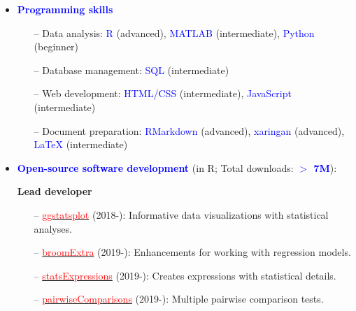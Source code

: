 \documentclass[10pt]{article}
\begin{document}
	\begin{itemize}
	
	\item \textcolor{blue}{\textbf{Programming skills}}\\
     \vspace*{-0.09in}
     
    \begin{itemize}
    
    \itemsep-0.1em		
	\item[--] Data analysis: \textcolor{blue}{R} (advanced), \textcolor{blue}{MATLAB} (intermediate), \textcolor{blue}{Python} (beginner)
	\item[--] Database management: \textcolor{blue}{SQL} (intermediate)
	\item[--] Web development: \textcolor{blue}{HTML/CSS} (intermediate), \textcolor{blue}{JavaScript} (intermediate)
	\item[--] Document preparation: \textcolor{blue}{RMarkdown} (advanced), \textcolor{blue}{xaringan} (advanced), \textcolor{blue}{\LaTeX{}} (intermediate)

	\end{itemize}
	
	\item \textcolor{blue}{\textbf{Open-source software development}} (in R; Total downloads: \textcolor{blue}{\textbf{$>$ 7M}}):
	 
	 \textbf{Lead developer}
	 
	\begin{itemize}
	
	 \vspace*{-0.09in}
	\itemsep-0.1em
	\item[--] \href{https://indrajeetpatil.github.io/ggstatsplot/}{\textcolor{red}{ggstatsplot}} (2018-): Informative data visualizations with statistical analyses.
	\item[--] \href{https://indrajeetpatil.github.io/broomExtra/}{\textcolor{red}{broomExtra}} (2019-): Enhancements for working with regression models.
	\item[--] \href{https://indrajeetpatil.github.io/statsExpressions/}{\textcolor{red}{statsExpressions}} (2019-): Creates expressions with statistical details.
	\item[--] \href{https://indrajeetpatil.github.io/pairwiseComparisons/}{\textcolor{red}{pairwiseComparisons}} (2019-): Multiple pairwise comparison tests.
	

\end{itemize}
\end{itemize}
\end{document}
